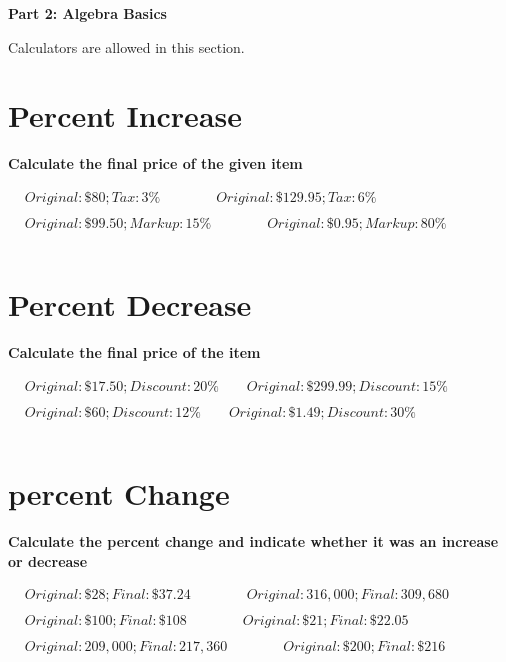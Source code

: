 \documentclass{article}
\begin{document}
\begin{center}
	{\huge \textbf{Part 2: Algebra Basics}}

	Calculators are allowed in this section.
\end{center}

\bigskip
\section{Percent Increase}
\bigskip
\textbf{Calculate the final price of the given item}

\bigskip

\(\begin{aligned}
	&Original: \$80; Tax: 3\%  \qquad\qquad Original: \$129.95; Tax: 6\% \\\\
	&Original: \$99.50; Markup: 15\% \qquad\qquad	 Original: \$0.95; Markup: 80\% \\\\
\end{aligned}\)

\section{Percent Decrease}
\bigskip
\textbf{Calculate the final price of the item}

\bigskip

\(\begin{aligned}
	&Original: \$17.50; Discount: 20\%  \qquad Original: \$299.99; Discount: 15\% \\\\
	&Original: \$60; Discount: 12\% \qquad	 Original: \$1.49; Discount: 30\% \\\\
\end{aligned}\)

\section{percent Change}
\bigskip
\textbf{Calculate the percent change and indicate whether it was an increase or decrease}

\bigskip

\(\begin{aligned}
	&Original: \$28; Final: \$37.24  \qquad\qquad Original: 316,000; Final: 309,680 \\\\
	&Original: \$100; Final: \$108 \qquad\qquad	 Original: \$21; Final: \$22.05 \\\\
	&Original: 209,000; Final: 217,360 \qquad\qquad	 Original: \$200; Final: \$216 \\\\
\end{aligned}\)
\end{document}
